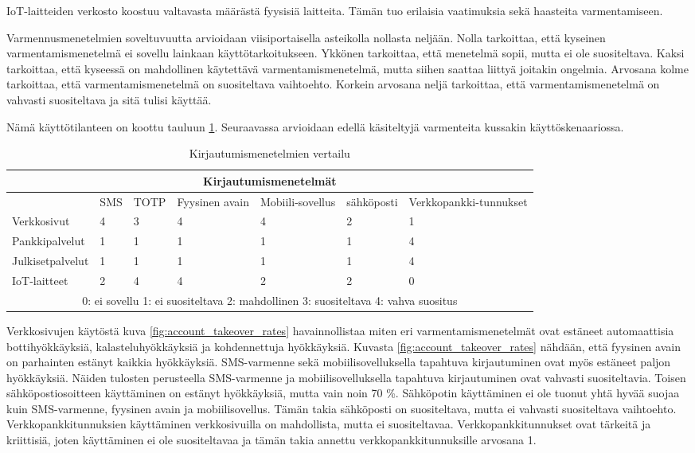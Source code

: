 IoT-laitteiden verkosto koostuu valtavasta määrästä fyysisiä laitteita. Tämän tuo erilaisia vaatimuksia sekä haasteita varmentamiseen.

Varmennusmenetelmien soveltuvuutta arvioidaan viisiportaisella asteikolla nollasta neljään. Nolla tarkoittaa, että kyseinen varmentamismenetelmä ei sovellu lainkaan käyttötarkoitukseen. Ykkönen tarkoittaa, että menetelmä sopii, mutta ei ole suositeltava. Kaksi tarkoittaa, että kyseessä on mahdollinen käytettävä varmentamismenetelmä, mutta siihen saattaa liittyä joitakin ongelmia. Arvosana kolme tarkoittaa, että varmentamismenetelmä on suositeltava vaihtoehto. Korkein arvosana neljä tarkoittaa, että varmentamismenetelmä on vahvasti suositeltava ja sitä tulisi käyttää.

Nämä käyttötilanteen on koottu tauluun \ref{tab:vertailu}. Seuraavassa arvioidaan edellä käsiteltyjä varmenteita kussakin käyttöskenaariossa.

\begin{table}[ht]
\begin{tabular}{ |p{3cm}|p{1cm}|p{}|p{}|p{}|p{2cm}|p{}|  }
 \hline
 \multicolumn{7}{|c|}{ Kirjautumismenetelmät} \\
 \hline
 & SMS & TOTP &Fyysinen avain & Mobiili-sovellus & sähköposti & Verkkopankki-tunnukset\\
 \hline
 Verkkosivut& 4 & 3 & 4 & 4 & 2 & 1\\
 Pankkipalvelut& 1 & 1 & 1 & 1 & 1 & 4\\
 Julkisetpalvelut& 1 & 1 & 1 & 1 & 1 & 4\\
 IoT-laitteet& 2 & 4 & 4 & 2 & 2 & 0\\
 \hline
 \multicolumn{7}{|c|}{
0: ei sovellu
1: ei suositeltava
2: mahdollinen
3: suositeltava
4: vahva suositus} \\
\hline

\end{tabular}
\caption{\label{tab:vertailu} Kirjautumismenetelmien vertailu}
\end{table}

Verkkosivujen käytöstä kuva \ref{fig:account_takeover_rates} havainnollistaa miten eri varmentamismenetelmät ovat estäneet automaattisia bottihyökkäyksiä, kalasteluhyökkäyksiä ja kohdennettuja hyökkäyksiä. Kuvasta \ref{fig:account_takeover_rates} nähdään, että fyysinen avain on parhainten estänyt kaikkia hyökkäyksiä. SMS-varmenne sekä mobiilisovelluksella tapahtuva kirjautuminen ovat myös estäneet paljon hyökkäyksiä. Näiden tulosten perusteella SMS-varmenne ja mobiilisovelluksella tapahtuva kirjautuminen ovat vahvasti suositeltavia. Toisen sähköpostiosoitteen käyttäminen on estänyt hyökkäyksiä, mutta vain noin 70 \%. Sähköpotin käyttäminen ei ole tuonut yhtä hyvää suojaa kuin SMS-varmenne, fyysinen avain ja mobiilisovellus. Tämän takia sähköposti on suositeltava, mutta ei vahvasti suositeltava vaihtoehto. Verkkopankkitunnuksien käyttäminen verkkosivuilla on mahdollista, mutta ei suositeltavaa. Verkkopankkitunnukset ovat tärkeitä ja kriittisiä, joten käyttäminen ei ole suositeltavaa ja tämän takia annettu verkkopankkitunnuksille arvosana 1.

